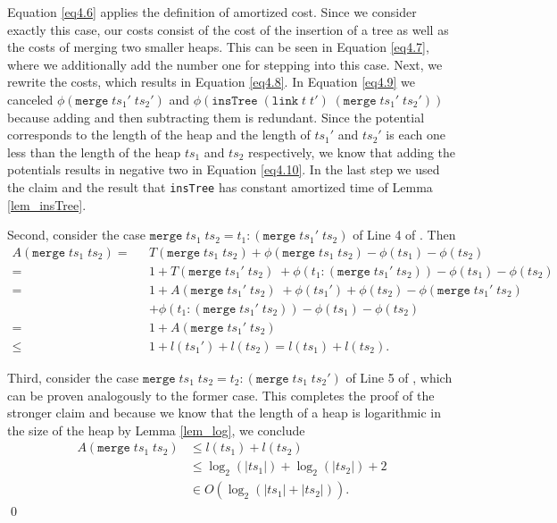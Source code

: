 \documentclass{clmthesis}
\begin{document}
{Equation \ref{eq4.6} applies the definition of amortized cost. Since we consider exactly this case, our costs consist of the cost of the insertion of a tree as well as the costs of merging two smaller heaps. This can be seen in Equation \ref{eq4.7}, where we additionally add the number one for stepping into this case. Next, we rewrite the costs, which results in Equation \ref{eq4.8}. In Equation \ref{eq4.9} we canceled $\phi(\texttt{merge} \; ts_1' \; ts_2')$ and $\phi(\texttt{insTree} \; (\texttt{link} \;t\;t')\;(\texttt{merge} \; ts_1' \; ts_2'))$ because adding and then subtracting them is redundant. Since the potential corresponds to the length of the heap and the length of $ts_1'$ and $ts_2'$ is each one less than the length of the heap $ts_1$ and $ts_2$ respectively, we know that adding the potentials results in negative two in Equation \ref{eq4.10}. In the last step we used the claim and the result that \texttt{insTree} has constant amortized time of Lemma \ref{lem_insTree}. 

Second, consider the case $\texttt{merge} \; ts_1 \; ts_2 = t_1 : (\texttt{merge} \; ts_1' \; ts_2)$ of Line 4 of . Then
\begin{align*}
	A(\texttt{merge} \; ts_1 \; ts_2) =\text{ }& T(\texttt{merge} \; ts_1 \; ts_2) + \phi(\texttt{merge} \; ts_1 \; ts_2) - \phi(ts_1) - \phi(ts_2)\\
	=\text{ }& 1 + T(\texttt{merge} \; ts_1' \; ts_2)\;+ \phi(t_1:(\texttt{merge} \; ts_1' \; ts_2)) - \phi(ts_1)-\phi(ts_2) \\
	=\text{ }& 1 + A(\texttt{merge} \; ts_1' \; ts_2)\;+\phi(ts_1')+\phi(ts_2)-\phi(\texttt{merge} \; ts_1' \; ts_2)\\ &+\phi(t_1:(\texttt{merge} \; ts_1' \; ts_2)) - \phi(ts_1)-\phi(ts_2)\\
	=\text{ }& 1 + A(\texttt{merge} \; ts_1' \; ts_2) \\
	\leq\text{ }& 1 + l(ts_1') + l(ts_2) = l(ts_1) + l(ts_2).
\end{align*}

Third, consider the case $\texttt{merge} \; ts_1 \; ts_2 = t_2 : (\texttt{merge} \; ts_1 \; ts_2')$ of Line 5 of , which can be proven analogously to the former case. This completes the proof of the stronger claim and because we know that the length of a heap is logarithmic in the size of the heap by Lemma \ref{lem_log}, we conclude
\begin{align*}
	A(\texttt{merge}\;ts_1\;ts_2) &\leq l(ts_1)+l(ts_2) \\
	& \leq \log_2(|ts_1|) + \log_2(|ts_2|) + 2\\
	& \in O(\log_2(|ts_1|+|ts_2|)).
\end{align*}
\qed
}
\end{document}
